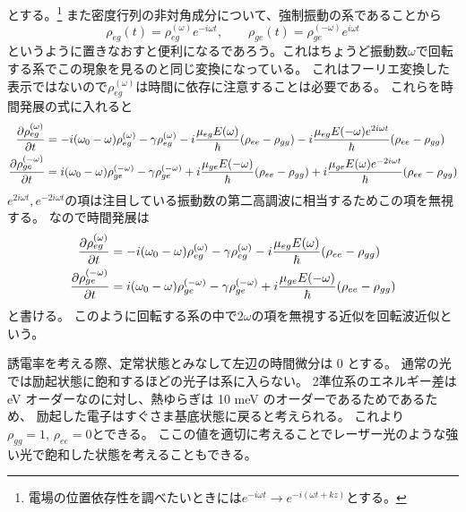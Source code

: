 \documentclass[11pt,dvipdfmx,a4paper]{jsarticle}
\begin{document}
とする。\footnote{電場の位置依存性を調べたいときには\(e^{-i\omega t} \rightarrow e^{-i(\omega t +kz)}\)とする。}
また密度行列の非対角成分について、強制振動の系であることから
\begin{equation}
	\rho_{eg}(t) = \rho_{eg}^{(\omega)} e^{-i\omega t}
	, \qquad \rho_{ge}(t) = \rho_{ge}^{(-\omega)} e^{ i\omega t}  \label{eq:rho_fourier}
\end{equation}
というように置きなおすと便利になるであろう。これはちょうど振動数\(\omega\)で回転する系でこの現象を見るのと同じ変換になっている。
これはフーリエ変換した表示ではないので\(\rho_{eg}^{(\omega)}\)は時間に依存に注意することは必要である。
これらを時間発展の式に入れると
\begin{align}
	\pdv{\rho_{eg}^{(\omega)}}{t}
	  &= -i(\omega_0-\omega)\rho_{eg}^{( \omega)} -\gamma\rho_{eg}^{( \omega)} -i\frac{\mu_{eg}E( \omega)}{\hbar}(\rho_{ee}-\rho_{gg})-i\frac{\mu_{eg}E(-\omega)e^{ 2i\omega t}}{\hbar}(\rho_{ee}-\rho_{gg})\\
	\pdv{\rho_{ge}^{(-\omega)}}{t}
	  &=  i(\omega_0-\omega)\rho_{ge}^{(-\omega)} -\gamma\rho_{ge}^{(-\omega)} +i\frac{\mu_{ge}E(-\omega)}{\hbar}(\rho_{ee}-\rho_{gg})+i\frac{\mu_{ge}E(\omega)e^{-2i\omega t}}{\hbar}(\rho_{ee}-\rho_{gg})
\end{align}
\(e^{2i\omega t}, e^{-2i\omega t}\)の項は注目している振動数の第二高調波に相当するためこの項を無視する。
なので時間発展は
\begin{align}
	\pdv{\rho_{eg}^{(\omega)}}{t}
	  &= -i(\omega_0-\omega)\rho_{eg}^{( \omega)} -\gamma\rho_{eg}^{( \omega)} -i\frac{\mu_{eg}E( \omega)}{\hbar}(\rho_{ee}-\rho_{gg})\\
	\pdv{\rho_{ge}^{(-\omega)}}{t}
	  &=  i(\omega_0-\omega)\rho_{ge}^{(-\omega)} -\gamma\rho_{ge}^{(-\omega)} +i\frac{\mu_{ge}E(-\omega)}{\hbar}(\rho_{ee}-\rho_{gg})
\end{align}
と書ける。
このように回転する系の中で\(2\omega \)の項を無視する近似を回転波近似という。

誘電率を考える際、定常状態とみなして左辺の時間微分は 0 とする。
通常の光では励起状態に飽和するほどの光子は系に入らない。
2準位系のエネルギー差は eV オーダーなのに対し、熱ゆらぎは 10 meV のオーダーであるためであるため、
励起した電子はすぐさま基底状態に戻ると考えられる。
これより\(\rho_{gg} = 1,\,\rho_{ee} = 0\)とできる。
ここの値を適切に考えることでレーザー光のような強い光で飽和した状態を考えることもできる。
\end{document}
